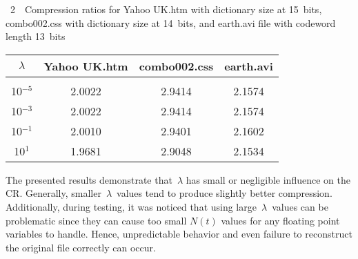 \begin{multicols}{2}
\vspace*{12pt}

\noindent  %
{{\normalsize{\tablename~2}}\ \ \small{Compression ratios for Yahoo UK.htm  with dictionary size at 15~bits,
combo002.css with dictionary size at 14~bits, and
 earth.avi file with codeword length 13~bits}}
{\small
\begin{center} 

 \vspace*{3pt}

\tabcolsep=8.2pt
\begin{tabular}{cccc}
\hline
$\lambda$ & Yahoo UK.htm & combo002.css & earth.avi\\
\hline
&&&\\[-9pt]
10$^{-5}$ & 2.0022& 2.9414& 2.1574\\
10$^{-3}$ & 2.0022& 2.9414& 2.1574\\
10$^{-1}$ & 2.0010& 2.9401& 2.1602\\
10$^1$\hphantom{$^-$} & 1.9681& 2.9048& 2.1534\\
\hline
\end{tabular}
 
  \end{center}}

    \vspace*{12pt}

The presented results demonstrate that~$\lambda$ has small or negligible 
influence on the CR. Generally, smaller~$\lambda$~values tend to 
produce slightly better compression.  Additionally, during testing, it was noticed 
that using large~$\lambda$~values can be problematic since they can cause too 
small $N(t)$ values for any floating point variables to handle. Hence, 
unpredictable behavior and even failure to reconstruct the original file correctly 
can occur. 


\begin{figure*} %
 \vspace*{1pt}
 \begin{center}
 \mbox{%
 \epsfxsize=140.12mm
 }
 \end{center}
 \vspace*{-11pt}
\label{f:F6}
\end{figure*}

\vspace*{-3pt}


\end{multicols}
